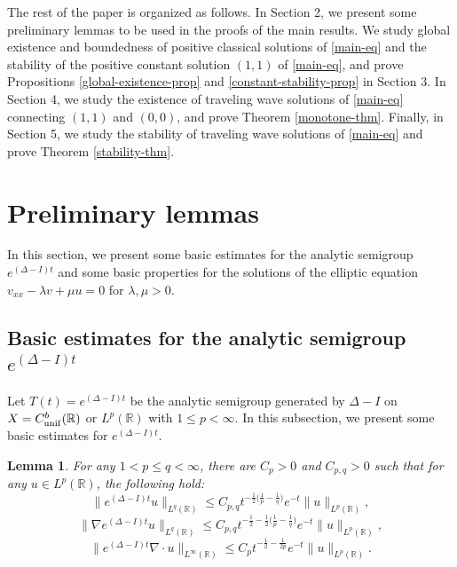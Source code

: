 \documentclass[11pt]{article} %
\newtheorem{lemma}{Lemma}[section]
\theoremstyle{remark}
\theoremstyle{remark}
\numberwithin{equation}{section}
\numberwithin{figure}{section}
\numberwithin{table}{section}
\newcommand\RR{\ensuremath{\mathbb{R}}}
\begin{document}
The rest of the paper is organized as follows. In Section 2, we present some preliminary lemmas to be used in the proofs of the main results.  We study global existence and boundedness of positive classical solutions of \eqref{main-eq}  and  the stability of the positive constant solution $(1,1)$ of \eqref{main-eq}, and prove Propositions \ref{global-existence-prop} and
\ref{constant-stability-prop} in Section 3. In Section 4,   we study the existence of traveling wave solutions of \eqref{main-eq} connecting
$(1,1)$ and $(0,0)$, and prove Theorem \ref{monotone-thm}. Finally, in Section 5,  we study the stability of traveling wave solutions of \eqref{main-eq} and prove Theorem \ref{stability-thm}. 

\section{Preliminary lemmas}
\label{prelim-section}

In this section, we present   some basic estimates for the analytic semigroup $e^{(\Delta -I)t}$ and  some basic properties for the solutions of the elliptic equation
$v_{xx}-\lambda v+\mu u=0$ for  $\lambda,\mu>0$.



\subsection{Basic estimates for the analytic semigroup $e^{(\Delta -I)t}$}


Let $T(t)=e^{(\Delta -I)t}$ be the analytic semigroup generated by $\Delta-I$ on
$X=C_{\rm unif}^b(\RR)$ or $L^p(\RR)$ with $1\le p<\infty$.  In this  subsection, we present some basic estimates for  $e^{(\Delta -I)t}$.

\begin{lemma}
\label{prelim-semigroup-lm1}
For any $1<p\le q<\infty$, there are $C_p>0$ and $C_{p,q}>0$  such that for any $u\in L^p(\RR)$, the following hold:
\begin{equation}
\label{prelim-semigroup-eq1}
\|e^{(\Delta -I)t}u\|_{L^q(\RR)}\le C_{p,q} t^{-\frac{1}{2}\big(\frac{1}{p}-\frac{1}{q}\big)} e^{-t}\|u\|_{L^p(\RR)},
\end{equation}
\begin{equation}
\label{prelim-semigroup-eq2}
\|\nabla e^{(\Delta -I)t}u\|_{L^q(\RR)}\le C_{p,q} t^{-\frac{1}{2}-\frac{1}{2}\big(\frac{1}{p}-\frac{1}{q}\big)} e^{-t}\|u\|_{L^p(\RR)},
\end{equation}
\begin{equation}
\label{prelim-semigroup-eq3}
\|e^{(\Delta -I)t}\nabla \cdot u\|_{L^\infty(\RR)}\le C_p t^{-\frac{1}{2}-\frac{1}{2p}}e^{-t}\|u\|_{L^p(\RR)}.
\end{equation}
\end{lemma}
\end{document}
